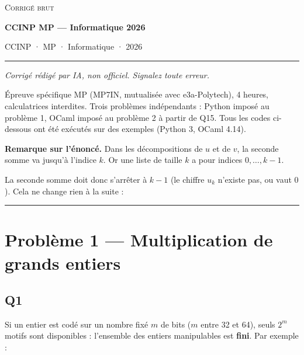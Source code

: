 \documentclass[11pt,a4paper]{article}
\newcommand{\equationajustee}[1]{%
  \sbox{\boiteequation}{$\displaystyle #1$}%
  \ifdim\wd\boiteequation>\linewidth
    \[\resizebox{\linewidth}{!}{\usebox{\boiteequation}}\]%
  \else
    \[#1\]%
  \fi}
\begin{document}
\thispagestyle{plain}
\begin{center}
  {\small\scshape Corrigé brut}\par\smallskip
  {\LARGE\bfseries CCINP MP — Informatique 2026\par}\medskip
  {\large CCINP · MP · Informatique · 2026\par}
\end{center}
\vspace{2pt}\hrule\vspace{8pt}

\emph{Corrigé rédigé par IA, non officiel. Signalez toute erreur.}

Épreuve spécifique MP (MP7IN, mutualisée avec e3a-Polytech), 4 heures, calculatrices interdites. Trois problèmes indépendants : Python imposé au problème 1, OCaml imposé au problème 2 à partir de Q15. Tous les codes ci-dessous ont été exécutés sur des exemples (Python 3, OCaml 4.14).

\textbf{Remarque sur l'énoncé.} Dans les décompositions de \(u\) et de \(v\), la seconde somme va jusqu'à l'indice \(k\). Or une liste de taille \(k\) a pour indices \(0, \dots, k-1\).

La seconde somme doit donc s'arrêter à \(k-1\) (le chiffre \(u_k\) n'existe pas, ou vaut \(0\)). Cela ne change rien à la suite :

\equationajustee{\begin{aligned}
f_u &= \sum_{i=0}^{k/2-1} u_{i+k/2}\, b^i, \\
u &= d_u + b^{k/2} f_u.
\end{aligned}}

\begin{center}\rule{0.5\linewidth}{0.5pt}\end{center}

\hypertarget{probluxe8me-1-multiplication-de-grands-entiers}{%
\section{Problème 1 --- Multiplication de grands entiers}\label{probluxe8me-1-multiplication-de-grands-entiers}}

\hypertarget{q1}{%
\subsection{Q1}\label{q1}}

Si un entier est codé sur un nombre fixé \(m\) de bits (\(m\) entre 32 et 64), seuls \(2^m\) motifs sont disponibles : l'ensemble des entiers manipulables est \textbf{fini}. Par exemple :
\end{document}
